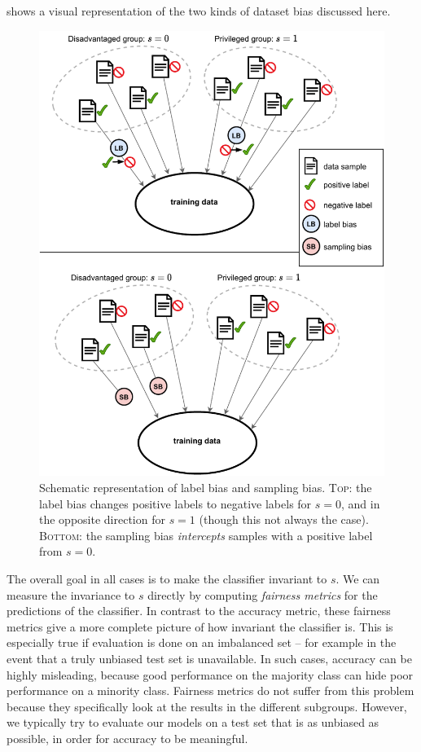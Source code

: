  shows a visual representation of the two kinds of dataset bias discussed here.

\begin{figure}[tp]
  \centering
  \includegraphics[width=\textwidth]{figures/dataset_bias_overview_vertical.pdf}
  \caption{%
    Schematic representation of label bias and sampling bias.
    \textsc{Top}: the label bias changes positive labels to negative labels for \(s=0\),
    and in the opposite direction for \(s=1\) (though this not always the case).
    \textsc{Bottom}: the sampling bias \emph{intercepts} samples with a positive label from \(s=0\).
  }%
  \label{fig:dataset-bias-overview}
\end{figure}

The overall goal in all cases is to make the classifier invariant to $s$.
We can measure the invariance to $s$ directly by computing \emph{fairness metrics}
for the predictions of the classifier.
In contrast to the accuracy metric,
these fairness metrics give a more complete picture of how invariant the classifier is.
This is especially true if evaluation is done on an imbalanced set
-- for example in the event that a truly unbiased test set is unavailable.
In such cases, accuracy can be highly misleading,
because good performance on the majority class can hide poor performance on a minority class.
Fairness metrics do not suffer from this problem
because they specifically look at the results in the different subgroups.
However, we typically try to evaluate our models on a test set that is as unbiased as possible,
in order for accuracy to be meaningful.

